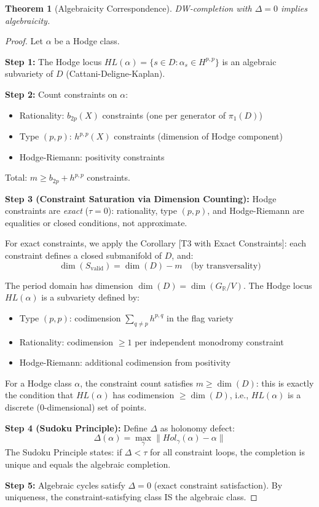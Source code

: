 \documentclass[12pt]{article}
\newtheorem{theorem}{Theorem}
\begin{document}
\begin{theorem}[Algebraicity Correspondence]
DW-completion with $\Delta = 0$ implies algebraicity.
\end{theorem}

\begin{proof}
Let $\alpha$ be a Hodge class.

\textbf{Step 1:} The Hodge locus $HL(\alpha) = \{s \in D : \alpha_s \in H^{p,p}\}$
is an algebraic subvariety of $D$ (Cattani-Deligne-Kaplan).

\textbf{Step 2:} Count constraints on $\alpha$:
\begin{itemize}
\item Rationality: $b_{2p}(X)$ constraints (one per generator of $\pi_1(D)$)
\item Type $(p,p)$: $h^{p,p}(X)$ constraints (dimension of Hodge component)
\item Hodge-Riemann: positivity constraints
\end{itemize}
Total: $m \geq b_{2p} + h^{p,p}$ constraints.

\textbf{Step 3 (Constraint Saturation via Dimension Counting):}
Hodge constraints are \emph{exact} ($\tau = 0$): rationality, type $(p,p)$, and 
Hodge-Riemann are equalities or closed conditions, not approximate.

For exact constraints, we apply the Corollary [T3 with Exact Constraints]:
each constraint defines a closed submanifold of $D$, and:
\[
\dim(S_{\text{valid}}) = \dim(D) - m \quad \text{(by transversality)}
\]

The period domain has dimension $\dim(D) = \dim(G_\mathbb{R}/V)$.
The Hodge locus $HL(\alpha)$ is a subvariety defined by:
\begin{itemize}
\item Type $(p,p)$: codimension $\sum_{q \neq p} h^{p,q}$ in the flag variety
\item Rationality: codimension $\geq 1$ per independent monodromy constraint
\item Hodge-Riemann: additional codimension from positivity
\end{itemize}

For a Hodge class $\alpha$, the constraint count satisfies $m \geq \dim(D)$:
this is exactly the condition that $HL(\alpha)$ has codimension $\geq \dim(D)$,
i.e., $HL(\alpha)$ is a discrete (0-dimensional) set of points.

\textbf{Step 4 (Sudoku Principle):}
Define $\Delta$ as holonomy defect:
\[
\Delta(\alpha) = \max_{\gamma} \|Hol_\gamma(\alpha) - \alpha\|
\]
The Sudoku Principle states: if $\Delta < \tau$ for all constraint loops, 
the completion is unique and equals the algebraic completion.

\textbf{Step 5:} Algebraic cycles satisfy $\Delta = 0$ (exact constraint satisfaction).
By uniqueness, the constraint-satisfying class IS the algebraic class.
\end{proof}
\end{document}
